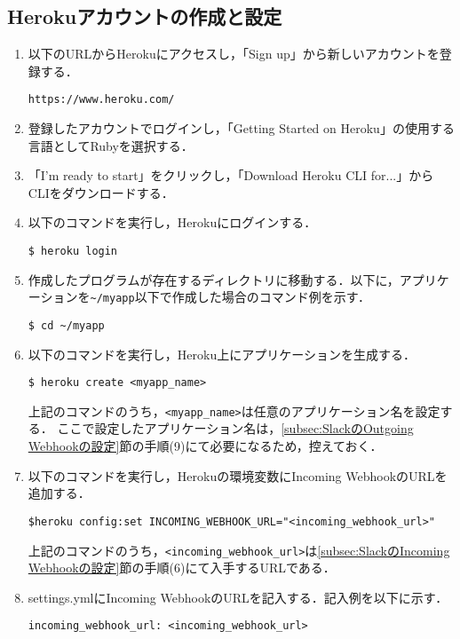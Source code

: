 \documentclass[12pt]{jsarticle}
\begin{document}
\subsection{Herokuアカウントの作成と設定}\label{subsec:Herokuアカウントの作成と設定}
\begin{enumerate}
  \item 以下のURLからHerokuにアクセスし，「Sign up」から新しいアカウントを登録する．
{
\fontsize{9pt}{10pt}\selectfont
\begin{verbatim}
https://www.heroku.com/
\end{verbatim}
}
  \item 登録したアカウントでログインし，「Getting Started on Heroku」の使用する言語としてRubyを選択する．
  \item 「I’m ready to start」をクリックし，「Download Heroku CLI for...」からCLIをダウンロードする．
  \item 以下のコマンドを実行し，Herokuにログインする．
{
\fontsize{9pt}{10pt}\selectfont
\begin{verbatim}
$ heroku login
\end{verbatim}
}
  \item 作成したプログラムが存在するディレクトリに移動する．以下に，アプリケーションを\verb|~/myapp|以下で作成した場合のコマンド例を示す．
{
\fontsize{9pt}{10pt}\selectfont
\begin{verbatim}
$ cd ~/myapp
\end{verbatim}
}
  \item 以下のコマンドを実行し，Heroku上にアプリケーションを生成する．
{
\fontsize{9pt}{10pt}\selectfont
\begin{verbatim}
$ heroku create <myapp_name>
\end{verbatim}
}
上記のコマンドのうち，\verb|<myapp_name>|は任意のアプリケーション名を設定する．
ここで設定したアプリケーション名は，\ref{subsec:SlackのOutgoing Webhookの設定}節の手順(9)にて必要になるため，控えておく．
  \item 以下のコマンドを実行し，Herokuの環境変数にIncoming WebhookのURLを追加する．
{
\fontsize{9pt}{10pt}\selectfont
\begin{verbatim}
$heroku config:set INCOMING_WEBHOOK_URL="<incoming_webhook_url>"
\end{verbatim}
}
上記のコマンドのうち，\verb|<incoming_webhook_url>|は\ref{subsec:SlackのIncoming Webhookの設定}節の手順(6)にて入手するURLである．
\item settings.ymlにIncoming WebhookのURLを記入する．記入例を以下に示す．
{
\fontsize{9pt}{10pt}\selectfont
\begin{verbatim}
incoming_webhook_url: <incoming_webhook_url>
\end{verbatim}
}
\end{enumerate}
\end{document}
